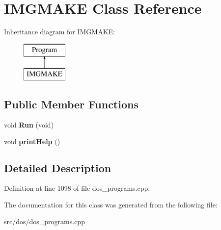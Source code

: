 \hypertarget{classIMGMAKE}{\section{I\-M\-G\-M\-A\-K\-E Class Reference}
\label{classIMGMAKE}
}
Inheritance diagram for I\-M\-G\-M\-A\-K\-E\-:\begin{figure}[H]
\begin{center}
\leavevmode
\includegraphics[height=2.000000cm]{classIMGMAKE}
\end{center}
\end{figure}
\subsection*{Public Member Functions}
\begin{DoxyCompactItemize}
\item 
\hypertarget{classIMGMAKE_afbd2116356dab83d08b978c72ee74340}{void {\bfseries Run} (void)}\label{classIMGMAKE_afbd2116356dab83d08b978c72ee74340}

\item 
\hypertarget{classIMGMAKE_aed2e86f96068d3380ddc72eb78377938}{void {\bfseries print\-Help} ()}\label{classIMGMAKE_aed2e86f96068d3380ddc72eb78377938}

\end{DoxyCompactItemize}


\subsection{Detailed Description}


Definition at line 1098 of file dos\-\_\-programs.\-cpp.



The documentation for this class was generated from the following file\-:\begin{DoxyCompactItemize}
\item 
src/dos/dos\-\_\-programs.\-cpp\end{DoxyCompactItemize}
